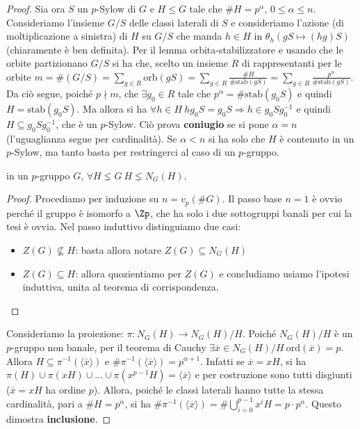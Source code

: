 \begin{proof}
    Sia ora $S$ un $p$-Sylow di $G$ e $H \leq G$ tale che $\#H = p^{\alpha}$, $0 \leq \alpha \leq n$. Consideriamo l'insieme $G/S$ delle classi laterali di $S$ e consideriamo l'azione (di moltiplicazione a sinistra) di $H$ su $G/S$ che manda $h \in H$ in $\theta_h(gS \mapsto (hg)S)$ (chiaramente è ben definita). Per il lemma orbita-stabilizzatore e usando che le orbite partizionano $G/S$ si ha che, scelto un insieme $R$ di rappresentanti per le orbite $m = \#(G/S) = \sum_{g \in R} \text{orb}(gS) = \sum_{g\in R} \frac{\#H}{\#\text{stab}(gS)} = \sum_{g\in R} \frac{p^{\alpha}}{\#\text{stab}(gS)}$. Da ciò segue, poiché $p \nmid m$, che $\exists g_0 \in R$ tale che $p^{\alpha} = \#\text{stab}(g_0S)$ e quindi $H = \text{stab}(g_0S)$. Ma allora si ha $\forall h \in H \ hg_0S = g_0S \Rightarrow h \in g_0 S g_0^{-1}$ e quindi $H \subseteq g_0Sg_0^{-1}$, che è un $p$-Sylow. Ciò prova \textbf{coniugio} se si pone $\alpha = n$ (l'uguaglianza segue per cardinalità).
    Se $\alpha < n$ si ha solo che $H$ è contenuto in un $p$-Sylow, ma tanto basta per restringerci al caso di un $p$-gruppo.
    \begin{lemma2}
        in un $p$-gruppo $G$, $\forall H \lneq G \ H \lneq N_G(H)$.
    \end{lemma2}
    \begin{proof}
        Procediamo per induzione su $n= v_p(\#G)$. Il passo base $n = 1$ è ovvio perché il gruppo è isomorfo a $\Zp$, che ha solo i due sottogruppi banali per cui la tesi è ovvia. Nel passo induttivo distinguiamo due casi: 
        \begin{itemize}
        \item $Z(G) \nsubseteq H$: basta allora notare  $Z(G) \subseteq N_G(H)$
        \item $Z(G) \subseteq H$: allora quozientiamo per $Z(G)$ e concludiamo usiamo l'ipotesi induttiva, unita al teorema di corrispondenza. 
        \end{itemize}
    \end{proof}
    Consideriamo la proiezione: $\pi: N_G(H) \rightarrow N_G(H)/H$. Poiché $N_G(H)/H$ è un $p$-gruppo non banale, per il teorema di Cauchy $\exists \overline x \in N_G(H)/H \ \text{ord}(\overline x) = p$. Allora $H \subseteq \pi^{-1}(\langle \overline x \rangle)$ e $\#\pi^{-1}(\langle \overline x \rangle) = p^{\alpha+1}$. Infatti se $\overline x = xH$, si ha $\pi(H)\cup \pi(xH)\cup\dots\cup\pi(x^{p-1}H) =  \langle \overline x \rangle$ e per costruzione sono tutti disgiunti ($\overline x = xH$ ha ordine $p$). Allora, poiché le classi laterali hanno tutte la stessa cardinalità, pari a $\#H = p^{\alpha}$, si ha $\#\pi^{-1}(\langle \overline x \rangle) = \#\bigcup_{i=0}^{p-1} x^iH = p\cdot p^{\alpha}$. Questo dimostra \textbf{inclusione}.
    

\end{proof}
